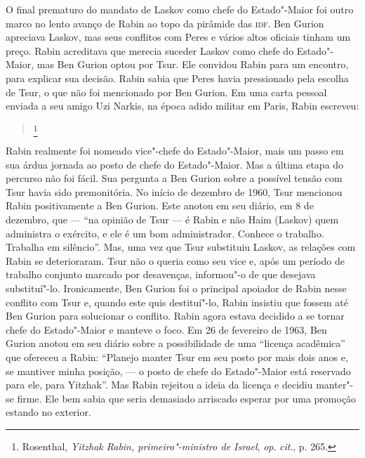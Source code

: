 O final prematuro do mandato de Laskov como chefe do Estado"-Maior foi
outro marco no lento avanço de Rabin ao topo da pirâmide das \textsc{idf}. Ben
Gurion apreciava Laskov, mas seus conflitos com Peres e vários altos
oficiais tinham um preço. Rabin acreditava que merecia suceder Laskov
como chefe do Estado"-Maior, mas Ben Gurion optou por Tsur. Ele convidou
Rabin para um encontro, para explicar sua decisão. Rabin sabia que Peres
havia pressionado pela escolha de Tsur, o que não foi mencionado por Ben
Gurion. Em uma carta pessoal enviada a seu amigo Uzi Narkis, na época
adido militar em Paris, Rabin escreveu: 

\begin{quote}
\footnote{Rosenthal, \textit{Yitzhak Rabin, primeiro"-ministro de Israel}, \textit{op}. \textit{cit}., p. 265.}
\end{quote}

Rabin realmente foi nomeado vice"-chefe do Estado"-Maior, mais um passo em
sua árdua jornada ao posto de chefe do Estado"-Maior. Mas a última etapa
do percurso não foi fácil. Sua pergunta a Ben Gurion sobre a possível
tensão com Tsur havia sido premonitória. No início de dezembro de 1960,
Tsur mencionou Rabin positivamente a Ben Gurion. Este anotou em
seu diário, em 8 de dezembro, que --- ``na opinião de Tsur --- é Rabin e não
Haim (Laskov) quem administra o exército, e ele é um bom administrador.
Conhece o trabalho. Trabalha em silêncio''. Mas, uma vez que Tsur
substituiu Laskov, as relações com Rabin se deterioraram. Tsur não o
queria como seu vice e, após um período de trabalho conjunto marcado por
desavenças, informou"-o de que desejava substituí"-lo. Ironicamente, Ben
Gurion foi o principal apoiador de Rabin nesse conflito com Tsur e,
quando este quis destituí"-lo, Rabin insistiu que fossem até Ben Gurion
para solucionar o conflito. Rabin agora estava decidido a se tornar
chefe do Estado"-Maior e manteve o foco. Em 26 de fevereiro de 1963, Ben
Gurion anotou em seu diário sobre a possibilidade de uma ``licença
acadêmica'' que ofereceu a Rabin: ``Planejo manter Tsur em
seu posto por mais dois anos e, se mantiver minha posição, --- o posto de
chefe do Estado"-Maior está reservado para ele, para Yitzhak''. Mas Rabin
rejeitou a ideia da licença e decidiu manter"-se firme. Ele bem sabia que
seria demasiado arriscado esperar por uma promoção estando no exterior.

